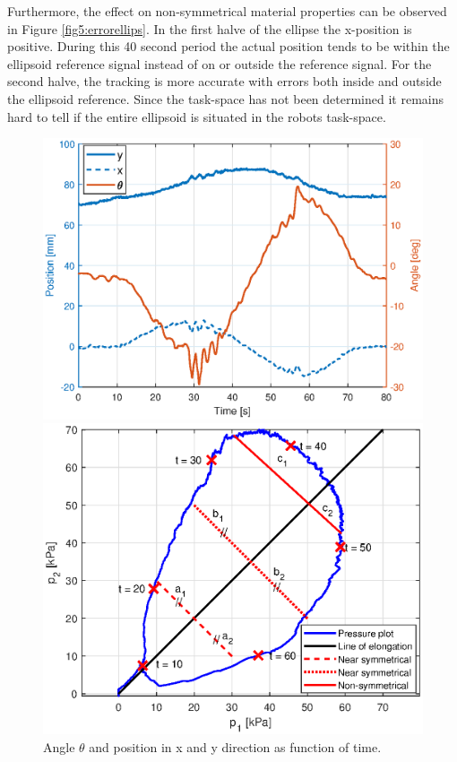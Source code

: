 Furthermore, the effect on non-symmetrical material properties can be observed in Figure \ref{fig5:errorellips}. In the first halve of the ellipse the x-position is positive. During this 40 second period the actual position tends to be within the ellipsoid reference signal instead of on or outside the reference signal. For the second halve, the tracking is more accurate with errors both inside and outside the ellipsoid reference. Since the task-space has not been determined it remains hard to tell if the entire ellipsoid is situated in the robots task-space. 



\begin{figure}[H] 
    \begin{minipage}[b]{0.49\linewidth}
    \centering
    \includegraphics[width = \textwidth]{Figures/Chapter5/ellipsthetaxyh.eps}
    \caption{Angle $\theta$ and position in x and y direction as function of time.}
    \label{fig5:ellipstheta}
       \end{minipage} 
    \begin{minipage}[b]{0.49\linewidth}
    \centering
    \includegraphics[width = \textwidth]{Figures/Chapter5/pressurecontour.eps}

\end{minipage}
\end{figure}
